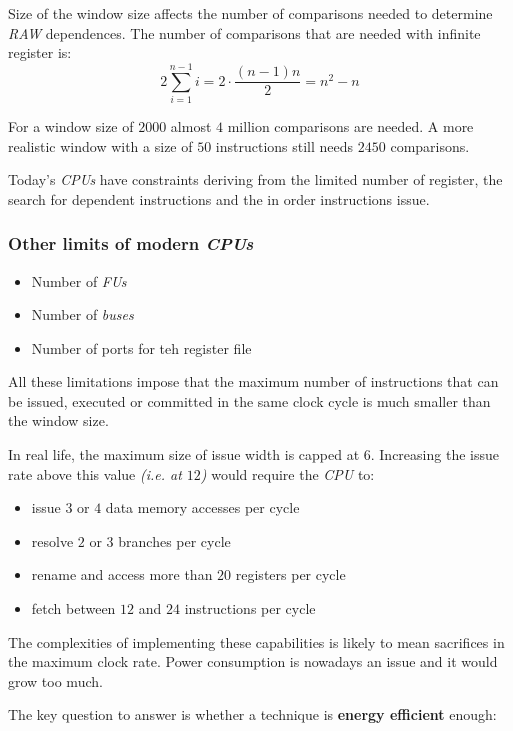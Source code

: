 \documentclass[english]{article}
\begin{document}
Size of the window size affects the number of comparisons needed to determine \textit{RAW} dependences.
The number of comparisons that are needed with infinite register is:
\[ \displaystyle 2 \sum^{n-1}_{i=1} i = 2 \cdot \dfrac{(n-1)n}{2} = n^2 - n \]

For a window size of \(2000\) almost \(4\) million comparisons are needed.
A more realistic window with a size of \(50\) instructions still needs \(2450\) comparisons.

Today's \textit{CPUs} have constraints deriving from the limited number of register, the search for dependent instructions and the in order instructions issue.

\subsubsection{Other limits of modern \textit{CPUs}}

\begin{itemize}
  \item Number of \textit{FUs}
  \item Number of \textit{buses}
  \item Number of ports for teh register file
\end{itemize}

All these limitations impose that the maximum number of instructions that can be issued, executed or committed in the same clock cycle is much smaller than the window size.

In real life, the maximum size of issue width is capped at \(6\).
Increasing the issue rate above this value \textit{(i.e. at \(12\))} would require the \textit{CPU} to:
\begin{itemize}
  \item issue \(3\) or \(4\) data memory accesses per cycle
  \item resolve \(2\) or \(3\) branches per cycle
  \item rename and access more than \(20\) registers per cycle
  \item fetch between \(12\) and \(24\) instructions per cycle
\end{itemize}

The complexities of implementing these capabilities is likely to mean sacrifices in the maximum clock rate.
Power consumption is nowadays an issue and it would grow too much.

\bigskip
The key question to answer is whether a technique is \textbf{energy efficient} enough:
\end{document}

